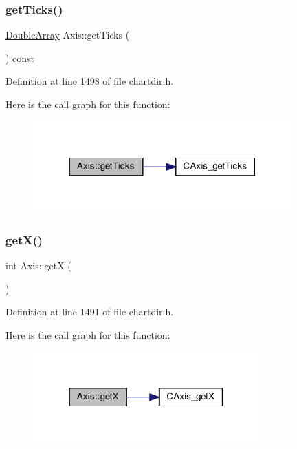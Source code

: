 \subsubsection{\texorpdfstring{get\+Ticks()}{getTicks()}}
{\footnotesize\ttfamily \hyperlink{class_double_array}{Double\+Array} Axis\+::get\+Ticks (\begin{DoxyParamCaption}{ }\end{DoxyParamCaption}) const\hspace{0.3cm}{\ttfamily [inline]}}



Definition at line 1498 of file chartdir.\+h.

Here is the call graph for this function\+:
\nopagebreak
\begin{figure}[H]
\begin{center}
\leavevmode
\includegraphics[width=282pt]{class_axis_a32d922936b68fc6b201dbe6faa08c905_cgraph}
\end{center}
\end{figure}
\mbox{\label{class_axis_a5c742dfcee277adf63daf6bb35e69ffa}} 
\subsubsection{\texorpdfstring{get\+X()}{getX()}}
{\footnotesize\ttfamily int Axis\+::getX (\begin{DoxyParamCaption}{ }\end{DoxyParamCaption})\hspace{0.3cm}{\ttfamily [inline]}}



Definition at line 1491 of file chartdir.\+h.

Here is the call graph for this function\+:
\nopagebreak
\begin{figure}[H]
\begin{center}
\leavevmode
\includegraphics[width=247pt]{class_axis_a5c742dfcee277adf63daf6bb35e69ffa_cgraph}
\end{center}
\end{figure}
\mbox{\label{class_axis_acad054ebcda8850d3d588ac6ed0c270d}} 

